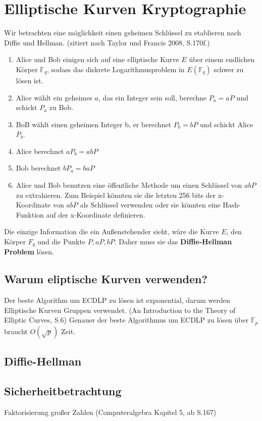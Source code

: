 \chapter{Elliptische Kurven Kryptographie}
\label{sec:kryptographie}
Wir betrachten eine möglichkeit einen geheimen Schlüssel zu etablieren nach Diffie und Hellman. (zitiert nach Taylor und Francis 2008, S.170f.)
\begin{enumerate}
    \item Alice und Bob einigen sich auf eine elliptische Kurve $E$ über einem endlichen Körper $\mathbb{F}_q$, sodass das diskrete Logarithmusproblem in $E(\mathbb{F}_q)$ schwer zu lösen ist.
    \item Alice wählt ein geheimes $a$, das ein Integer sein soll, berechne $P_a=aP$ und schickt $P_a$ zu Bob.
    \item BoB wählt einen geheimen Integer b, er berechnet $P_b=bP$ und schickt Alice $P_b$.
    \item Alice berechnet $aP_b=abP$
    \item Bob berechnet $bP_a=baP$
    \item Alice und Bob benutzen eine öffentliche Methode um einen Schlüssel von $abP$ zu extrahieren. Zum Beispiel könnten sie die letzten 256 bits der x-Koordinate von $abP$ als Schlüssel verwenden oder sie könnten eine Hash-Funktion auf der x-Koordinate definieren.
\end{enumerate}
Die einzige Information die ein Außenstehender sieht, wäre die Kurve $E$, den Körper $F_q$ und die Punkte $P, aP,bP$. Daher muss sie das \textbf{Diffie-Hellman Problem} lösen.

\section{Warum eliptische Kurven verwenden?}
Der beste Algorithm um ECDLP zu lösen ist exponential, darum werden Elliptische Kurven Gruppen verwendet. (An Introduction to the Theory of Elliptic Curves, S.6)
Genauer der beste Algorithmus um ECDLP zu lösen über $\mathbb{F}_p$ braucht $O(\sqrt p)$ Zeit.
\section{Diffie-Hellman}
\label{sec:diffie-hellman}


\section{Sicherheitbetrachtung}
Faktorisierung großer Zahlen (Computeralgebra Kapitel 5, ab S.167)
